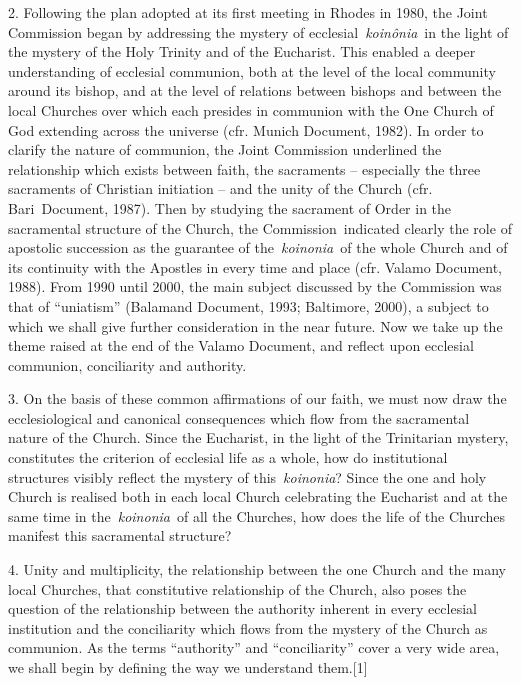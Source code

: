 2. Following the plan adopted at its first meeting in Rhodes in 1980,
the Joint Commission began by addressing the mystery of
ecclesial~\emph{koinônia}~in the light of the mystery of the Holy
Trinity and of the Eucharist. This enabled a deeper understanding of
ecclesial communion, both at the level of the local community around its
bishop, and at the level of relations between bishops and between the
local Churches over which each presides in communion with the One Church
of God extending across the universe (cfr. Munich Document, 1982). In
order to clarify the nature of communion, the Joint Commission
underlined the relationship which exists between faith, the sacraments
-- especially the three sacraments of Christian initiation -- and the
unity of the Church (cfr. Bari\emph{~}Document, 1987). Then by studying
the sacrament of Order in the sacramental structure of the Church, the
Commission\emph{~}indicated clearly the role of apostolic succession as
the guarantee of the~\emph{koinonia}~of the whole Church and of its
continuity with the Apostles in every time and place (cfr. Valamo
Document, 1988). From 1990 until 2000, the main subject discussed by the
Commission was that of ``uniatism'' (Balamand Document, 1993; Baltimore,
2000), a subject to which we shall give further consideration in the
near future. Now we take up the theme raised at the end of the Valamo
Document, and reflect upon ecclesial communion, conciliarity and
authority.

3. On the basis of these common affirmations of our faith, we must now
draw the ecclesiological and canonical consequences which flow from the
sacramental nature of the Church. Since the Eucharist, in the light of
the Trinitarian mystery, constitutes the criterion of ecclesial life as
a whole, how do institutional structures visibly reflect the mystery of
this~\emph{koinonia}? Since the one and holy Church is realised both in
each local Church celebrating the Eucharist and at the same time in
the~\emph{koinonia}~of all the Churches, how does the life of the
Churches manifest this sacramental structure?

4. Unity and multiplicity, the relationship between the one Church and
the many local Churches, that constitutive relationship of the Church,
also poses the question of the relationship between the authority
inherent in every ecclesial institution and the conciliarity which flows
from the mystery of the Church as communion. As the terms ``authority''
and ``conciliarity'' cover a very wide area, we shall begin by defining
the way we understand them.\label{_ftnref1}{}{[}1{]}

